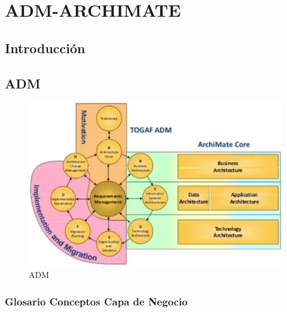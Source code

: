 \chapter{ADM-ARCHIMATE}
\section{Introducción}
\newpage

\section{ADM}

\begin{figure}[th!]
	\centering
	\includegraphics[width=0.7\linewidth]{arquitectura/adm_lenguaje/imgs/adm}
	\caption{ADM}
	\label{fig:adm}
\end{figure}

\newpage

\subsection{Glosario Conceptos Capa de Negocio}

